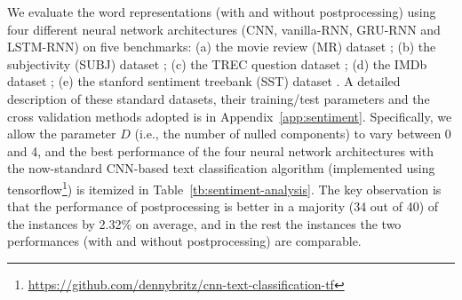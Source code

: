 \documentclass{article} \usepackage{acl2017,times}
\begin{document}
We evaluate the word representations (with and without postprocessing) using  four different neural network architectures (CNN, vanilla-RNN, GRU-RNN and LSTM-RNN) on  five benchmarks: (a) the movie review (MR) dataset \citep{pang2005seeing}; (b) the subjectivity (SUBJ) dataset \citep{pang2004sentimental}; (c) the TREC question dataset \citep{li2002learning}; (d) the IMDb dataset \citep{maas2011learning}; (e) the stanford sentiment treebank (SST) dataset \citep{socher2013reasoning}.  A detailed description of these standard datasets, their training/test parameters and the cross validation methods adopted is in Appendix~\ref{app:sentiment}. { Specifically, we allow the parameter $D$ (i.e., the number of nulled components) to vary between 0 and 4, and the best performance of the  four  neural network architectures with the now-standard CNN-based text classification algorithm \citep{kim2014convolutional} (implemented using tensorflow\footnote{\url{https://github.com/dennybritz/cnn-text-classification-tf}})  is itemized in Table~\ref{tb:sentiment-analysis}.  The key observation is that the performance of postprocessing is better in a majority (34 out of 40) of the instances by 2.32\% on average, and in the rest the instances the two performances (with and without postprocessing) are comparable. }
\end{document}
